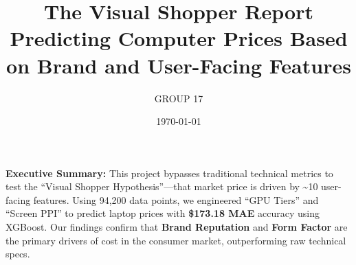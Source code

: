 \documentclass[11pt, a4paper]{article}
\title{\vspace{-2cm} \textbf{\LARGE The Visual Shopper Report} \\ \large Predicting Computer Prices Based on Brand and User-Facing Features}
\author{
    GROUP 17
}
\date{\vspace{-0.5cm}\today} %
\begin{document}
\maketitle

    \noindent \textbf{Executive Summary:} This project bypasses traditional technical metrics to test the ``Visual Shopper Hypothesis''—that market price is driven by \textasciitilde10 user-facing features. Using 94,200 data points, we engineered ``GPU Tiers'' and ``Screen PPI'' to predict laptop prices with \textbf{\$173.18 MAE} accuracy using XGBoost. Our findings confirm that \textbf{Brand Reputation} \cite{acsi2025} and \textbf{Form Factor} are the primary drivers of cost in the consumer market, outperforming raw technical specs.

\vspace{0.5cm}


\end{document}
